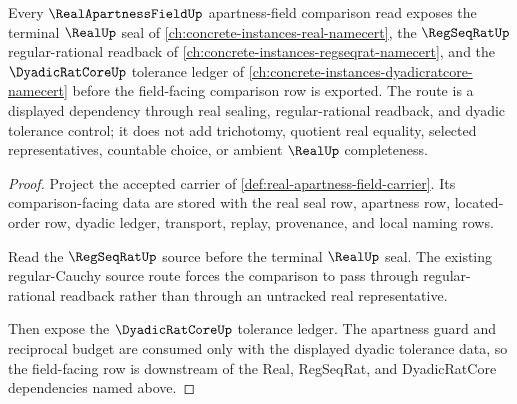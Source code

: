 \begin{theorem}
\label{thm:real-apartness-field-real-regseq-dyadic-route}
Every $\RealApartnessFieldUp$ apartness-field comparison read exposes the terminal $\RealUp$ seal of \autoref{ch:concrete-instances-real-namecert}, the $\RegSeqRatUp$ regular-rational readback of \autoref{ch:concrete-instances-regseqrat-namecert}, and the $\DyadicRatCoreUp$ tolerance ledger of \autoref{ch:concrete-instances-dyadicratcore-namecert} before the field-facing comparison row is exported. The route is a displayed dependency through real sealing, regular-rational readback, and dyadic tolerance control; it does not add trichotomy, quotient real equality, selected representatives, countable choice, or ambient $\RealUp$ completeness.
\end{theorem}
\begin{proof}
Project the accepted carrier of \autoref{def:real-apartness-field-carrier}. Its comparison-facing data are stored with the real seal row, apartness row, located-order row, dyadic ledger, transport, replay, provenance, and local naming rows.

Read the $\RegSeqRatUp$ source before the terminal $\RealUp$ seal. The existing regular-Cauchy source route forces the comparison to pass through regular-rational readback rather than through an untracked real representative.

Then expose the $\DyadicRatCoreUp$ tolerance ledger. The apartness guard and reciprocal budget are consumed only with the displayed dyadic tolerance data, so the field-facing row is downstream of the Real, RegSeqRat, and DyadicRatCore dependencies named above.
\end{proof}

